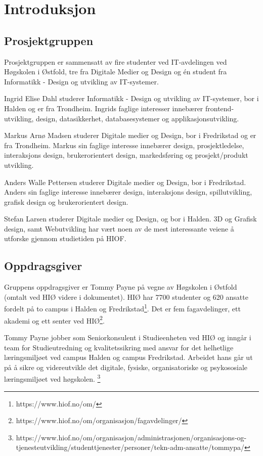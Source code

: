 \cleardoublepage
\chapter{Introduksjon}
\label{chap:intro}

\section{Prosjektgruppen}
Prosjektgruppen er sammensatt av fire studenter ved IT-avdelingen ved Høgskolen i Østfold, tre fra Digitale Medier og Design og én student fra Informatikk - Design og utvikling av IT-systemer.

Ingrid Elise Dahl studerer Informatikk - Design og utvikling av IT-systemer, bor i Halden og er fra Trondheim. Ingrids faglige interesser innebærer frontend-utvikling, design, datasikkerhet, databasesystemer og applikasjonsutvikling.

Markus Arnø Madsen studerer Digitale medier og Design, bor i Fredrikstad og er fra Trondheim. Markus sin faglige interesse innebærer design, prosjektledelse, interaksjons design, brukerorientert design, markedsføring og prosjekt/produkt utvikling.

Anders Walle Pettersen studerer Digitale medier og Design, bor i Fredrikstad. Anders sin faglige interesse innebærer design, interaksjons design, spillutvikling, grafisk design og brukerorientert design.

Stefan Larsen studerer Digitale medier og Design, og bor i Halden. 3D og Grafisk design, samt Webutvikling har vært noen av de mest interessante veiene å utforske gjennom studietiden på HIOF. 


\section{Oppdragsgiver}
Gruppens oppdragsgiver er Tommy Payne på vegne av Høgskolen i Østfold (omtalt ved HIØ videre i dokumentet). HIØ har 7700 studenter og 620 ansatte fordelt på to campus i Halden og Fredrikstad\footnote{https://www.hiof.no/om/}. Det er fem fagavdelinger, ett akademi og ett senter ved HIØ\footnote{https://www.hiof.no/om/organisasjon/fagavdelinger/}.

Tommy Payne jobber som Seniorkonsulent i Studieenheten ved HIØ og inngår i team for Studieutredning og kvalitetssikring med ansvar for det helhetlige læringsmiljøet ved campus Halden og campus Fredrikstad. Arbeidet hans går ut på å sikre og videreutvikle det digitale, fysiske, organisatoriske og psykososiale læringsmiljøet ved høgskolen. \footnote{https://www.hiof.no/om/organisasjon/administrasjonen/organisasjons-og-tjenesteutvikling/studenttjenester/personer/tekn-adm-ansatte/tommypa/}

